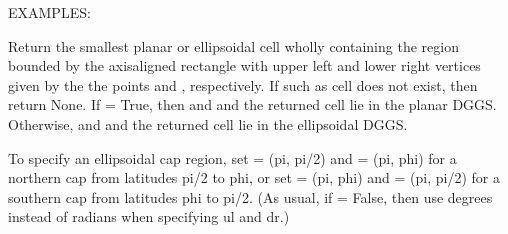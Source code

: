\documentclass[a4paper,12ptopenany,oneside,english]{sphinxmanual}
\begin{document}
\begin{fulllineitems}
\begin{fulllineitems}
\sphinxAtStartPar
EXAMPLES:

\begin{sphinxVerbatim}[commandchars=\\\{\}]
  
   
   
\end{sphinxVerbatim}

\end{fulllineitems}


\begin{fulllineitems}
\label{\detokenize{dggs:rhealpixdggs.dggs.RHEALPixDGGS.cell_from_region}}
\pysigstartsignatures
{}
\pysigstopsignatures
\sphinxAtStartPar
Return the smallest planar or ellipsoidal cell wholly containing
the region bounded by the axis\sphinxhyphen{}aligned rectangle with upper left
and lower right vertices given by the the points  and ,
respectively.
If such as cell does not exist, then return None.
If  = True, then  and  and the returned cell
lie in the planar DGGS.
Otherwise,  and  and the returned cell lie in the ellipsoidal
DGGS.

\sphinxAtStartPar
To specify an ellipsoidal cap region, set  = (\sphinxhyphen{}pi, pi/2) and
 = (\sphinxhyphen{}pi, phi) for a northern cap from latitudes pi/2 to phi, or
set  = (\sphinxhyphen{}pi, phi) and  = (\sphinxhyphen{}pi, \sphinxhyphen{}pi/2) for a southern cap from
latitudes phi to \sphinxhyphen{}pi/2.
(As usual, if  = False,
then use degrees instead of radians when specifying ul and dr.)


\end{fulllineitems}
\end{fulllineitems}
\end{document}
